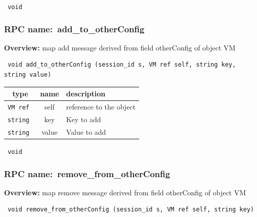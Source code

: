 \vspace{0.3cm}

{\tt 
void
}



\vspace{0.3cm}
\vspace{0.3cm}
\vspace{0.3cm}
\subsubsection{RPC name:~add\_to\_otherConfig}

{\bf Overview:} 
map add message derived from field otherConfig of object VM

\begin{verbatim} void add_to_otherConfig (session_id s, VM ref self, string key, string value)\end{verbatim}



 
\vspace{0.3cm}
\begin{tabular}{|c|c|p{7cm}|}
 \hline
{\bf type} & {\bf name} & {\bf description} \\ \hline
{\tt VM ref } & self & reference to the object \\ \hline 

{\tt string } & key & Key to add \\ \hline 

{\tt string } & value & Value to add \\ \hline 

\end{tabular}

\vspace{0.3cm}

{\tt 
void
}



\vspace{0.3cm}
\vspace{0.3cm}
\vspace{0.3cm}
\subsubsection{RPC name:~remove\_from\_otherConfig}

{\bf Overview:} 
map remove message derived from field otherConfig of object VM

\begin{verbatim} void remove_from_otherConfig (session_id s, VM ref self, string key)\end{verbatim}


